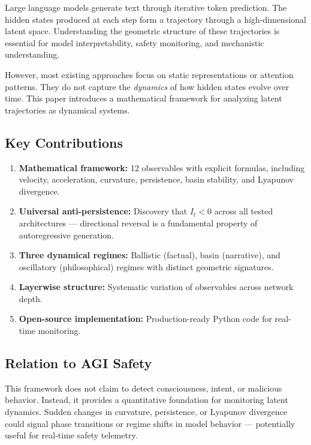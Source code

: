 \documentclass[12pt,a4paper]{article}
\begin{document}
Large language models generate text through iterative token prediction. The hidden states produced at each step form a trajectory through a high-dimensional latent space. Understanding the geometric structure of these trajectories is essential for model interpretability, safety monitoring, and mechanistic understanding.

However, most existing approaches focus on static representations or attention patterns. They do not capture the \emph{dynamics} of how hidden states evolve over time. This paper introduces a mathematical framework for analyzing latent trajectories as dynamical systems.

\subsection{Key Contributions}

\begin{enumerate}[noitemsep]
    \item \textbf{Mathematical framework:} 12 observables with explicit formulas, including velocity, acceleration, curvature, persistence, basin stability, and Lyapunov divergence.
    \item \textbf{Universal anti-persistence:} Discovery that $I_t < 0$ across all tested architectures — directional reversal is a fundamental property of autoregressive generation.
    \item \textbf{Three dynamical regimes:} Ballistic (factual), basin (narrative), and oscillatory (philosophical) regimes with distinct geometric signatures.
    \item \textbf{Layerwise structure:} Systematic variation of observables across network depth.
    \item \textbf{Open-source implementation:} Production-ready Python code for real-time monitoring.
\end{enumerate}

\subsection{Relation to AGI Safety}

This framework does not claim to detect consciousness, intent, or malicious behavior. Instead, it provides a quantitative foundation for monitoring latent dynamics. Sudden changes in curvature, persistence, or Lyapunov divergence could signal phase transitions or regime shifts in model behavior — potentially useful for real-time safety telemetry.
\end{document}
